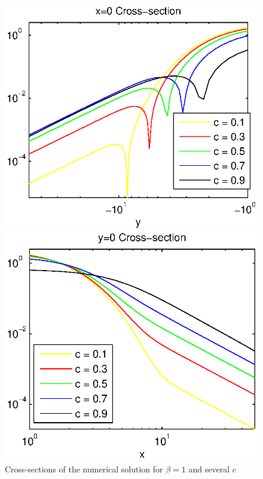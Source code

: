 \documentclass[preprint]{elsarticle}
\begin{document}
\begin{figure}[ht]
\begin{minipage}[b]{0.5\linewidth}
	\end{minipage}
	\begin{minipage}[b]{0.5\linewidth}
		\raggedleft
		\includegraphics[width=\linewidth]{cross-sections/c=01__09beta=1Logx=0.eps}
	\end{minipage}	
	\begin{minipage}[b]{0.5\linewidth}
		\raggedright
		 \includegraphics[width=\linewidth]{cross-sections/c=01__09beta=1Logy=0.eps}
	\end{minipage}
	\caption{Cross-sections of the numerical solution for $\beta=1$ and several  $c$}
	\label{profilesSpeedVarying}
\end{figure}
\end{document}
